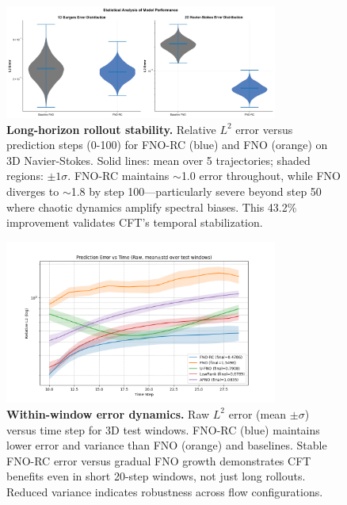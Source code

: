 \documentclass[11pt]{article}
\begin{document}
\begin{figure}[t]
\centering
\includegraphics[width=0.8\textwidth]{figures/long_term_prediction.png}
\caption{\textbf{Long-horizon rollout stability.} Relative $L^2$ error versus prediction steps (0-100) for FNO-RC (blue) and FNO (orange) on 3D Navier-Stokes. Solid lines: mean over 5 trajectories; shaded regions: $\pm 1\sigma$. FNO-RC maintains $\sim$1.0 error throughout, while FNO diverges to $\sim$1.8 by step 100—particularly severe beyond step 50 where chaotic dynamics amplify spectral biases. This 43.2\% improvement validates CFT's temporal stabilization.}
\label{fig:rollout}
\end{figure}

\begin{figure}[t]
\centering
\includegraphics[width=0.8\textwidth]{../实验图/error_vs_time_raw_mean.png}
\caption{\textbf{Within-window error dynamics.} Raw $L^2$ error (mean $\pm \sigma$) versus time step for 3D test windows. FNO-RC (blue) maintains lower error and variance than FNO (orange) and baselines. Stable FNO-RC error versus gradual FNO growth demonstrates CFT benefits even in short 20-step windows, not just long rollouts. Reduced variance indicates robustness across flow configurations.}
\label{fig:error_time}
\end{figure}
\end{document}
